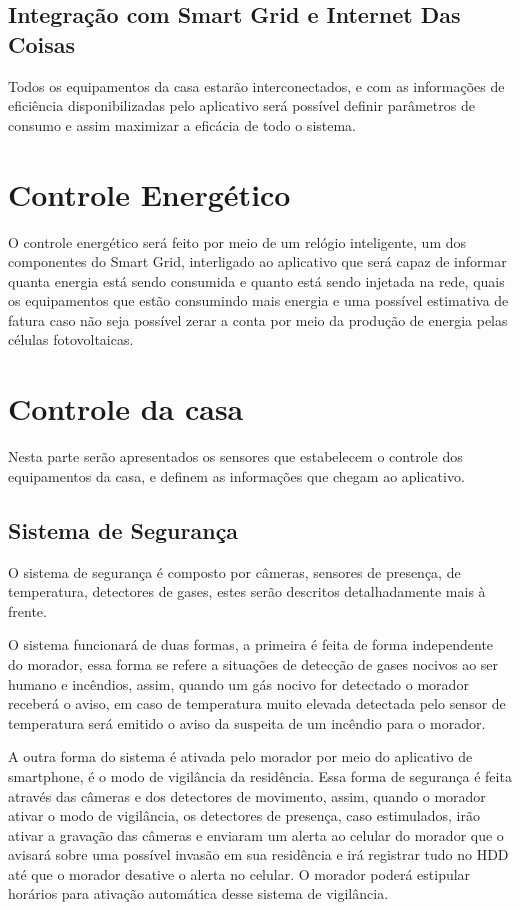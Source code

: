 \subsection{Integração com Smart Grid e Internet Das Coisas}
\par Todos os equipamentos da casa estarão interconectados, e com as informações de eficiência disponibilizadas pelo aplicativo será possível definir parâmetros de  consumo e assim maximizar a eficácia de todo o sistema.

\section{Controle Energético}
\par O controle energético será feito por meio de um relógio inteligente, um dos componentes do Smart Grid, interligado ao aplicativo que será capaz de informar quanta energia está sendo consumida e quanto está sendo injetada na rede, quais os equipamentos que estão consumindo mais energia e uma possível estimativa de fatura caso não seja possível zerar a conta por meio da produção de energia pelas células fotovoltaicas.

\section{Controle da casa}
\par Nesta parte serão apresentados os sensores que estabelecem o controle dos equipamentos da casa, e definem as informações que chegam ao aplicativo.

\subsection{Sistema de Segurança}
\par O sistema de segurança é composto por câmeras, sensores de presença, de temperatura, detectores de gases, estes serão descritos detalhadamente mais à frente.
\par O sistema funcionará de duas formas, a primeira é feita de forma independente do morador, essa forma se refere a situações de detecção de gases nocivos ao ser humano e incêndios, assim, quando um gás nocivo for detectado o morador receberá o aviso, em caso de temperatura muito elevada detectada pelo sensor de temperatura será emitido o aviso da suspeita de um incêndio para o morador.
\par A outra forma do sistema é ativada pelo morador por meio do aplicativo de smartphone, é o modo de vigilância da residência. Essa forma de segurança é feita através das câmeras e dos detectores de movimento, assim, quando o morador ativar o modo de vigilância, os detectores de presença, caso estimulados, irão ativar a gravação das câmeras e enviaram um alerta ao celular do morador que o avisará sobre uma possível invasão em sua residência e irá registrar tudo no HDD até que o morador desative o alerta no celular. O morador poderá estipular horários para ativação automática desse sistema de vigilância.

